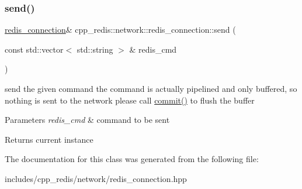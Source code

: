 \subsubsection{\texorpdfstring{send()}{send()}}
{\footnotesize\ttfamily \hyperlink{classcpp__redis_1_1network_1_1redis__connection}{redis\+\_\+connection}\& cpp\+\_\+redis\+::network\+::redis\+\_\+connection\+::send (\begin{DoxyParamCaption}\item[{const std\+::vector$<$ std\+::string $>$ \&}]{redis\+\_\+cmd }\end{DoxyParamCaption})}

send the given command the command is actually pipelined and only buffered, so nothing is sent to the network please call \hyperlink{classcpp__redis_1_1network_1_1redis__connection_a8e6980d40139877c16e995051b780d60}{commit()} to flush the buffer


\begin{DoxyParams}{Parameters}
{\em redis\+\_\+cmd} & command to be sent \\
\hline
\end{DoxyParams}
\begin{DoxyReturn}{Returns}
current instance 
\end{DoxyReturn}


The documentation for this class was generated from the following file\+:\begin{DoxyCompactItemize}
\item 
includes/cpp\+\_\+redis/network/redis\+\_\+connection.\+hpp\end{DoxyCompactItemize}
